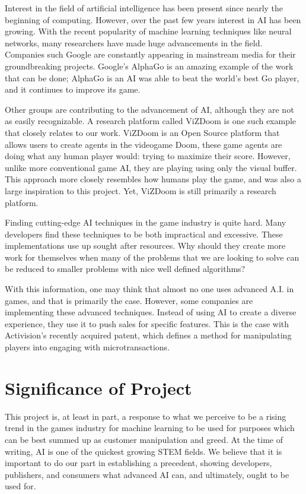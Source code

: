 Interest in the field of artificial intelligence has been present since nearly the beginning of computing. However, over the past few years interest in AI has been growing. With the recent popularity of machine learning techniques like neural networks, many researchers have made huge advancements in the field. Companies such Google are constantly appearing in mainstream media for their groundbreaking projects. Google's AlphaGo is an amazing example of the work that can be done; AlphaGo is an AI was able to beat the world's best Go player, and it continues to improve its game.

Other groups are contributing to the advancement of AI, although they are not as easily recognizable. A research platform called ViZDoom is one such example that closely relates to our work. ViZDoom is an Open Source platform that allows users to create agents in the videogame Doom, these game agents are doing what any human player would: trying to maximize their score. However, unlike more conventional game AI, they are playing using only the visual buffer. This approach more closely resembles how humans play the game, and was also a large inspiration to this project. Yet, ViZDoom is still primarily a research platform.

Finding cutting-edge AI techniques in the game industry is quite hard. Many developers find these techniques to be both impractical and excessive. These implementations use up sought after resources. Why should they create more work for themselves when many of the problems that we are looking to solve can be reduced to smaller problems with nice well defined algorithms?

With this information, one may think that almost no one uses advanced A.I. in games, and that is primarily the case. However, some companies are implementing these advanced techniques. Instead of using AI to create a diverse experience, they use it to push sales for specific features. This is the case with Activision's recently acquired patent, which defines a method for manipulating players into engaging with microtransactions.



\section{Significance of Project}

This project is, at least in part, a response to what we perceive to be a rising trend in the games industry for machine learning to be used for purposes which can be best summed up as customer manipulation and greed. At the time of writing, AI is one of the quickest growing STEM fields. We believe that it is important to do our part in establishing a precedent, showing developers, publishers, and consumers what advanced AI can, and ultimately, ought to be used for.


